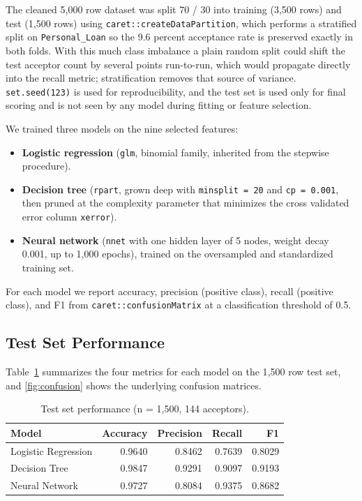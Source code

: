 \documentclass[11pt, a4paper]{article}
\begin{document}
The cleaned 5{,}000 row dataset was split 70 / 30 into training (3{,}500
rows) and test (1{,}500 rows) using \texttt{caret::createDataPartition},
which performs a stratified split on \texttt{Personal\_Loan} so the 9.6
percent acceptance rate is preserved exactly in both folds. With this much
class imbalance a plain random split could shift the test acceptor count
by several points run-to-run, which would propagate directly into the
recall metric; stratification removes that source of variance.
\texttt{set.seed(123)} is used for reproducibility, and the test set is
used only for final scoring and is not seen by any model during fitting or
feature selection.

We trained three models on the nine selected features:

\begin{itemize}[itemsep=4pt]
    \item \textbf{Logistic regression} (\texttt{glm}, binomial family,
          inherited from the stepwise procedure).
    \item \textbf{Decision tree} (\texttt{rpart}, grown deep with
          \texttt{minsplit = 20} and \texttt{cp = 0.001}, then pruned at
          the complexity parameter that minimizes the cross validated
          error column \texttt{xerror}).
    \item \textbf{Neural network} (\texttt{nnet} with one hidden layer of
          5 nodes, weight decay 0.001, up to 1{,}000 epochs), trained on
          the oversampled and standardized training set.
\end{itemize}

For each model we report accuracy, precision (positive class), recall
(positive class), and F1 from \texttt{caret::confusionMatrix} at a
classification threshold of 0.5.

\subsection{Test Set Performance}

Table~\ref{tab:results} summarizes the four metrics for each model on the
1{,}500 row test set, and \autoref{fig:confusion} shows the underlying
confusion matrices.

\begin{table}[!htbp]
\centering
\caption{Test set performance (n = 1{,}500, 144 acceptors).}
\label{tab:results}
\begin{tabular}{@{} l r r r r @{}}
\toprule
Model               & Accuracy & Precision & Recall & F1 \\
\midrule
Logistic Regression & 0.9640   & 0.8462    & 0.7639 & 0.8029 \\
Decision Tree       & 0.9847   & 0.9291    & 0.9097 & 0.9193 \\
Neural Network      & 0.9727   & 0.8084    & 0.9375 & 0.8682 \\
\bottomrule
\end{tabular}
\end{table}
\end{document}
